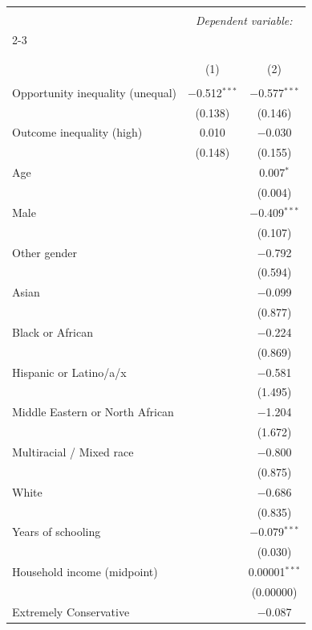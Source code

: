 
\begin{table}[H] \centering 
  \caption{} 
  \label{} 
\tiny 
\begin{tabular}{@{\extracolsep{5pt}}lcc} 
\\[-1.8ex]\hline 
\hline \\[-1.8ex] 
 & \multicolumn{2}{c}{\textit{Dependent variable:}} \\ 
\cline{2-3} 
\\[-1.8ex] & \multicolumn{2}{c}{} \\ 
\\[-1.8ex] & (1) & (2)\\ 
\hline \\[-1.8ex] 
 Opportunity inequality (unequal) & $-$0.512$^{***}$ & $-$0.577$^{***}$ \\ 
  & (0.138) & (0.146) \\ 
  Outcome inequality (high) & 0.010 & $-$0.030 \\ 
  & (0.148) & (0.155) \\ 
  Age &  & 0.007$^{*}$ \\ 
  &  & (0.004) \\ 
  Male &  & $-$0.409$^{***}$ \\ 
  &  & (0.107) \\ 
  Other gender &  & $-$0.792 \\ 
  &  & (0.594) \\ 
  Asian &  & $-$0.099 \\ 
  &  & (0.877) \\ 
  Black or African &  & $-$0.224 \\ 
  &  & (0.869) \\ 
  Hispanic or Latino/a/x &  & $-$0.581 \\ 
  &  & (1.495) \\ 
  Middle Eastern or North African &  & $-$1.204 \\ 
  &  & (1.672) \\ 
  Multiracial / Mixed race &  & $-$0.800 \\ 
  &  & (0.875) \\ 
  White &  & $-$0.686 \\ 
  &  & (0.835) \\ 
  Years of schooling &  & $-$0.079$^{***}$ \\ 
  &  & (0.030) \\ 
  Household income (midpoint) &  & 0.00001$^{***}$ \\ 
  &  & (0.00000) \\ 
  Extremely Conservative &  & $-$0.087 \\ 

\end{tabular}
\end{table}

